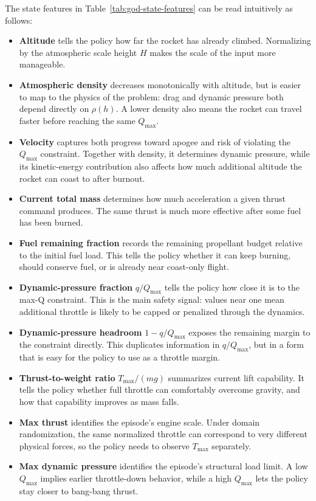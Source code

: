 \documentclass[mnsc,sglanonrev]{informs4}
\begin{document}
\begin{APPENDICES}
The state features in Table~\ref{tab:god-state-features} can be read intuitively as follows:
\begin{itemize}
  \item \textbf{Altitude} tells the policy how far the rocket has already climbed. Normalizing by the atmospheric scale height $H$ makes the scale of the input more manageable.
  \item \textbf{Atmospheric density} decreases monotonically with altitude, but is easier to map to the physics of the problem: drag and dynamic pressure both depend directly on $\rho(h)$. A lower density also means the rocket can travel faster before reaching the same $Q_{\max}$.
  \item \textbf{Velocity} captures both progress toward apogee and risk of violating the $Q_{\max}$ constraint. Together with density, it determines dynamic pressure, while its kinetic-energy contribution also affects how much additional altitude the rocket can coast to after burnout.
  \item \textbf{Current total mass} determines how much acceleration a given thrust command produces. The same thrust is much more effective after some fuel has been burned.
  \item \textbf{Fuel remaining fraction} records the remaining propellant budget relative to the initial fuel load. This tells the policy whether it can keep burning, should conserve fuel, or is already near coast-only flight.
  \item \textbf{Dynamic-pressure fraction} $q/Q_{\max}$ tells the policy how close it is to the max-Q constraint. This is the main safety signal: values near one mean additional throttle is likely to be capped or penalized through the dynamics.
  \item \textbf{Dynamic-pressure headroom} $1-q/Q_{\max}$ exposes the remaining margin to the constraint directly. This duplicates information in $q/Q_{\max}$, but in a form that is easy for the policy to use as a throttle margin.
  \item \textbf{Thrust-to-weight ratio} $T_{\max}/(mg)$ summarizes current lift capability. It tells the policy whether full throttle can comfortably overcome gravity, and how that capability improves as mass falls.
  \item \textbf{Max thrust} identifies the episode's engine scale. Under domain randomization, the same normalized throttle can correspond to very different physical forces, so the policy needs to observe $T_{\max}$ separately.
  \item \textbf{Max dynamic pressure} identifies the episode's structural load limit. A low $Q_{\max}$ implies earlier throttle-down behavior, while a high $Q_{\max}$ lets the policy stay closer to bang-bang thrust.

\end{itemize}
\end{APPENDICES}
\end{document}
